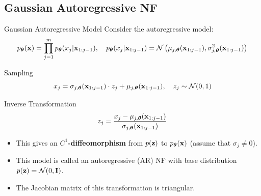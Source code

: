 \documentclass{beamer}
\renewcommand{\eqpause}{}
\begin{document}
\subsection{Gaussian Autoregressive NF}
\begin{frame}{Gaussian Autoregressive Model}
	Consider the autoregressive model:
	\vspace{-0.3cm}
	{\small
		\[
		p_{\boldsymbol{\theta}}(\mathbf{x}) = \prod_{j=1}^m p_{\boldsymbol{\theta}}(x_j | \mathbf{x}_{1:j-1}), \quad
		p_{\boldsymbol{\theta}}(x_j | \mathbf{x}_{1:j-1}) = \mathcal{N} \left(\mu_{j, \boldsymbol{\theta}}(\mathbf{x}_{1:j-1}), \sigma^2_{j, \boldsymbol{\theta}} (\mathbf{x}_{1:j-1})\right)
		\]
	}
	\vspace{-0.5cm}
	\eqpause
	\begin{block}{Sampling}
		\vspace{-0.3cm}
		\[
		x_j = \sigma_{j, \boldsymbol{\theta}} (\mathbf{x}_{1:j-1}) \cdot z_j + \mu_{j, \boldsymbol{\theta}}(\mathbf{x}_{1:j-1}), \quad z_j \sim \mathcal{N}(0, 1)
		\]
		\vspace{-0.7cm}
	\end{block}
	\eqpause
	\begin{block}{Inverse Transformation}
		\vspace{-0.5cm}
		\[
		z_j = \frac{x_j - \mu_{j, \boldsymbol{\theta}}(\mathbf{x}_{1:j-1})}{\sigma_{j, \boldsymbol{\theta}} (\mathbf{x}_{1:j-1}) }
		\]
		\vspace{-0.4cm}
	\end{block}
	\eqpause
	\begin{itemize}
		\item This gives an \textbf{$C^1$-diffeomorphism} from $p(\mathbf{z})$ to $p_{\boldsymbol{\theta}}(\mathbf{x})$ (assume that $\sigma_j \neq 0$).
		    \eqpause
		\item This model is called an autoregressive (AR) NF with base distribution $p(\mathbf{z}) = \mathcal{N}(0, \mathbf{I})$.
		    \eqpause
		\item The Jacobian matrix of this transformation is triangular.
	\end{itemize}
\end{frame}
\end{document}
